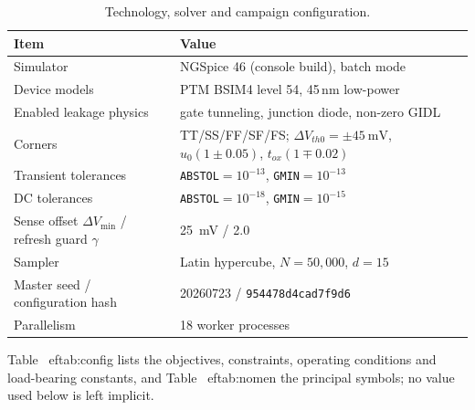 \documentclass[11pt,a4paper]{article}
\newcommand{\dVmin}{\Delta V_{\min}}
\begin{document}
\begin{table}[!ht]
\centering
\caption{Technology, solver and campaign configuration.}
\label{tab:setup}
\footnotesize
\begin{tabular}{@{}ll@{}}
\toprule
\textbf{Item} & \textbf{Value} \\
\midrule
Simulator & NGSpice 46 (console build), batch mode \cite{ngspice} \\
Device models & PTM BSIM4 level 54, 45\,nm low-power \cite{zhao2006ptm} \\
Enabled leakage physics & gate tunneling, junction diode, non-zero GIDL \\
Corners & TT/SS/FF/SF/FS; $\Delta V_{th0}=\pm\SI{45}{\milli\volt}$,
$u_0(1\pm0.05)$, $t_{ox}(1\mp0.02)$ \\
Transient tolerances & \texttt{ABSTOL}$=10^{-13}$, \texttt{GMIN}$=10^{-13}$ \\
DC tolerances & \texttt{ABSTOL}$=10^{-18}$, \texttt{GMIN}$=10^{-15}$ \\
Sense offset $\dVmin$ / refresh guard $\gamma$ & \SI{25}{\milli\volt} / 2.0 \\
Sampler & Latin hypercube, $N=50{,}000$, $d=15$ \\
Master seed / configuration hash & 20260723 / \texttt{954478d4cad7f9d6} \\
Parallelism & 18 worker processes \\
\bottomrule
\end{tabular}
\end{table}

Table~
ef{tab:config} lists the objectives, constraints, operating
conditions and load-bearing constants, and Table~
ef{tab:nomen} the
principal symbols; no value used below is left implicit.
\end{document}
